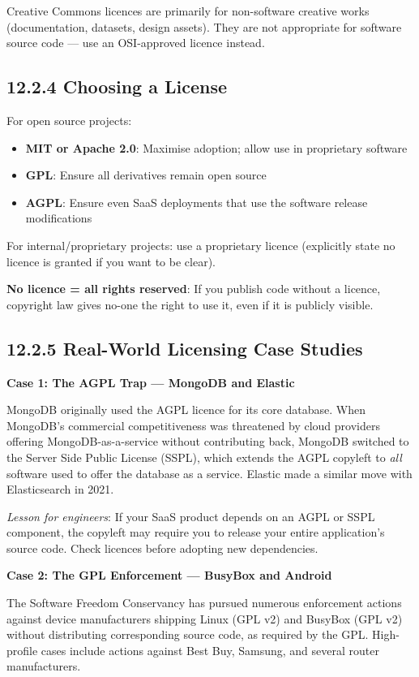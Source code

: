\documentclass[11pt,a4paper]{book}
\begin{document}
Creative Commons licences are primarily for non-software creative works (documentation, datasets, design assets). They are not appropriate for software source code --- use an OSI-approved licence instead.

\subsection{12.2.4 Choosing a License}

For open source projects:
\begin{itemize}
  \item \textbf{MIT or Apache 2.0}: Maximise adoption; allow use in proprietary software
  \item \textbf{GPL}: Ensure all derivatives remain open source
  \item \textbf{AGPL}: Ensure even SaaS deployments that use the software release modifications
\end{itemize}

For internal/proprietary projects: use a proprietary licence (explicitly state no licence is granted if you want to be clear).

\textbf{No licence = all rights reserved}: If you publish code without a licence, copyright law gives no-one the right to use it, even if it is publicly visible.

\subsection{12.2.5 Real-World Licensing Case Studies}

\textbf{Case 1: The AGPL Trap --- MongoDB and Elastic}

MongoDB originally used the AGPL licence for its core database. When MongoDB's commercial competitiveness was threatened by cloud providers offering MongoDB-as-a-service without contributing back, MongoDB switched to the Server Side Public License (SSPL), which extends the AGPL copyleft to \textit{all} software used to offer the database as a service. Elastic made a similar move with Elasticsearch in 2021.

\textit{Lesson for engineers}: If your SaaS product depends on an AGPL or SSPL component, the copyleft may require you to release your entire application's source code. Check licences before adopting new dependencies.

\textbf{Case 2: The GPL Enforcement --- BusyBox and Android}

The Software Freedom Conservancy has pursued numerous enforcement actions against device manufacturers shipping Linux (GPL v2) and BusyBox (GPL v2) without distributing corresponding source code, as required by the GPL. High-profile cases include actions against Best Buy, Samsung, and several router manufacturers.
\end{document}
